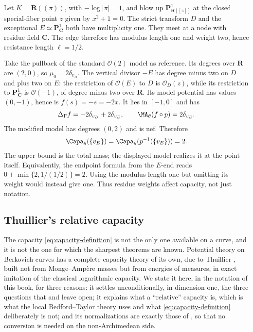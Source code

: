 \begin{example}
\label{ex:ch25-nonsplit-capacity}
Let \(K=\mathbf R((\pi))\), with \(-\log|\pi|=1\), and blow up
\(\mathbf P^1_{\mathbf R[[\pi]]}\) at the closed special-fiber point
\(z\) given by \(x^2+1=0\).
The strict transform \(D\) and the exceptional
\(E\simeq\mathbf P^1_{\mathbf C}\) both have multiplicity one.
They meet at a node with residue field \(\mathbf C\).
The edge therefore has modulus length one and weight two, hence
resistance length \(\ell=1/2\).

Take the pullback of the standard \(\mathcal O(2)\) model as
reference.  Its degrees over \(\mathbf R\) are \((2,0)\), so
\(\mu_0=2\delta_{v_D}\).
The vertical divisor \(-E\) has degree minus two on \(D\) and
plus two on \(E\): the restriction of \(\mathcal O(E)\) to \(D\)
is \(\mathcal O_D(z)\), while its restriction to
\(\mathbf P^1_{\mathbf C}\) is \(\mathcal O(-1)\), of degree
minus two over \(\mathbf R\).
Its model potential has values \((0,-1)\), hence is
\(f(s)=-s=-2x\).  It lies in \([-1,0]\) and has
\[
 \Delta_\Gamma f=-2\delta_{v_D}+2\delta_{v_E},
 \qquad \MA_\theta(f\circ p)=2\delta_{v_E}.
\]
The modified model has degrees \((0,2)\) and is nef.  Therefore
\[
 \Capa_\theta(\{v_E\})
 =\Capa_\theta(p^{-1}(\{v_E\}))=2.
\]
The upper bound is the total mass; the displayed model realizes
it at the point itself.  Equivalently, the endpoint formula from
the \(E\)-end reads \(0+\min\{2,1/(1/2)\}=2\).
Using the modulus length one but omitting its weight would instead
give one.  Thus residue weights affect capacity, not just notation.
\end{example}

\subsection{Thuillier's relative capacity}
\label{sec:ch25-thuillier}

The capacity \eqref{eq:capacity-definition} is not the only one available on
a curve, and it is not the one for which the sharpest theorems are known.
Potential theory on Berkovich curves has a complete capacity theory of its
own, due to Thuillier \cite{Thu05}, built not from Monge--Amp\`ere masses but
from energies of measures, in exact imitation of the classical logarithmic
capacity.  We state it here, in the notation of this book, for three
reasons: it settles unconditionally, in dimension one, the three questions
that  and
 leave open; it explains what a
``relative'' capacity is, which is what the local Bedford--Taylor theory
uses and what \eqref{eq:capacity-definition} deliberately is not; and its
normalizations are exactly those of , so that no
conversion is needed on the non-Archimedean side.

